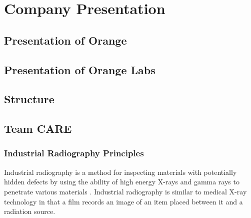 
\chapter{Company Presentation} %

\label{Chapter2} %




\section{Presentation of Orange}



\section{Presentation of Orange Labs}

\section{Structure}

\section{Team CARE}


\subsection{Industrial Radiography Principles}
Industrial radiography is a method for inspecting materials with potentially hidden defects by using the ability of high energy X-rays and gamma rays to penetrate various materials \citep{Reference9}. Industrial radiography is similar to medical X-ray technology in that a film records an image of an item placed between it and a radiation source.


